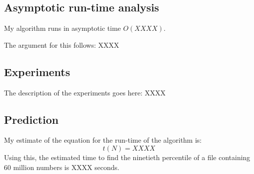\documentclass{article}
\begin{document}
\subsection{Asymptotic run-time analysis}

My algorithm runs in asymptotic time $O(XXXX)$. 

The argument for this follows:
XXXX

\subsection{Experiments}
\label{sec:experiments2}
The description of the experiments goes here: XXXX


%  


\subsection{Prediction}
\label{sec:prediction2}

My estimate of the equation for the run-time of the algorithm is:
\begin{equation}
  \label{eq:estimated_runtime2}
  t(N) = XXXX
\end{equation}
Using this, the estimated time to find the ninetieth percentile of a
file containing 60 million numbers is XXXX seconds.
\end{document}
